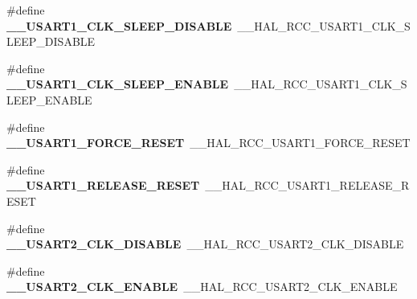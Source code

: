 \begin{DoxyCompactItemize}
\item 
\hypertarget{group___h_a_l___r_c_c___aliased_gaa4dced1323153e27e9c29faebee35ddb}{\#define {\bfseries \-\_\-\-\_\-\-U\-S\-A\-R\-T1\-\_\-\-C\-L\-K\-\_\-\-S\-L\-E\-E\-P\-\_\-\-D\-I\-S\-A\-B\-L\-E}~\-\_\-\-\_\-\-H\-A\-L\-\_\-\-R\-C\-C\-\_\-\-U\-S\-A\-R\-T1\-\_\-\-C\-L\-K\-\_\-\-S\-L\-E\-E\-P\-\_\-\-D\-I\-S\-A\-B\-L\-E}\label{group___h_a_l___r_c_c___aliased_gaa4dced1323153e27e9c29faebee35ddb}

\item 
\hypertarget{group___h_a_l___r_c_c___aliased_ga6378b19a4a228da0e399b703b018f10c}{\#define {\bfseries \-\_\-\-\_\-\-U\-S\-A\-R\-T1\-\_\-\-C\-L\-K\-\_\-\-S\-L\-E\-E\-P\-\_\-\-E\-N\-A\-B\-L\-E}~\-\_\-\-\_\-\-H\-A\-L\-\_\-\-R\-C\-C\-\_\-\-U\-S\-A\-R\-T1\-\_\-\-C\-L\-K\-\_\-\-S\-L\-E\-E\-P\-\_\-\-E\-N\-A\-B\-L\-E}\label{group___h_a_l___r_c_c___aliased_ga6378b19a4a228da0e399b703b018f10c}

\item 
\hypertarget{group___h_a_l___r_c_c___aliased_gaf29da865725f4aa165fa9f551c40025e}{\#define {\bfseries \-\_\-\-\_\-\-U\-S\-A\-R\-T1\-\_\-\-F\-O\-R\-C\-E\-\_\-\-R\-E\-S\-E\-T}~\-\_\-\-\_\-\-H\-A\-L\-\_\-\-R\-C\-C\-\_\-\-U\-S\-A\-R\-T1\-\_\-\-F\-O\-R\-C\-E\-\_\-\-R\-E\-S\-E\-T}\label{group___h_a_l___r_c_c___aliased_gaf29da865725f4aa165fa9f551c40025e}

\item 
\hypertarget{group___h_a_l___r_c_c___aliased_ga705c0a674be8a0f70f013a31f7f2ee1c}{\#define {\bfseries \-\_\-\-\_\-\-U\-S\-A\-R\-T1\-\_\-\-R\-E\-L\-E\-A\-S\-E\-\_\-\-R\-E\-S\-E\-T}~\-\_\-\-\_\-\-H\-A\-L\-\_\-\-R\-C\-C\-\_\-\-U\-S\-A\-R\-T1\-\_\-\-R\-E\-L\-E\-A\-S\-E\-\_\-\-R\-E\-S\-E\-T}\label{group___h_a_l___r_c_c___aliased_ga705c0a674be8a0f70f013a31f7f2ee1c}

\item 
\hypertarget{group___h_a_l___r_c_c___aliased_gad87c7e24f846f645280bcab507705301}{\#define {\bfseries \-\_\-\-\_\-\-U\-S\-A\-R\-T2\-\_\-\-C\-L\-K\-\_\-\-D\-I\-S\-A\-B\-L\-E}~\-\_\-\-\_\-\-H\-A\-L\-\_\-\-R\-C\-C\-\_\-\-U\-S\-A\-R\-T2\-\_\-\-C\-L\-K\-\_\-\-D\-I\-S\-A\-B\-L\-E}\label{group___h_a_l___r_c_c___aliased_gad87c7e24f846f645280bcab507705301}

\item 
\hypertarget{group___h_a_l___r_c_c___aliased_ga8d6e2f7f87edd62b54140152a8f662c4}{\#define {\bfseries \-\_\-\-\_\-\-U\-S\-A\-R\-T2\-\_\-\-C\-L\-K\-\_\-\-E\-N\-A\-B\-L\-E}~\-\_\-\-\_\-\-H\-A\-L\-\_\-\-R\-C\-C\-\_\-\-U\-S\-A\-R\-T2\-\_\-\-C\-L\-K\-\_\-\-E\-N\-A\-B\-L\-E}\label{group___h_a_l___r_c_c___aliased_ga8d6e2f7f87edd62b54140152a8f662c4}


\end{DoxyCompactItemize}
